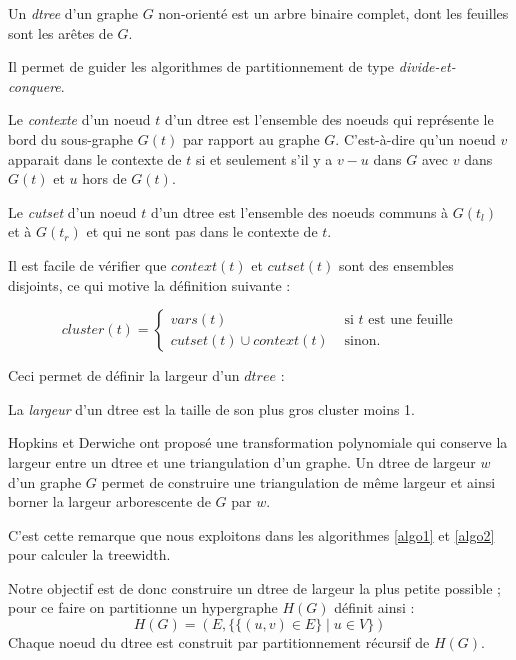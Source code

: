 \documentclass{article}
\begin{document}
\begin{mdef}
Un \emph{dtree} d'un graphe $G$ non-orienté est un arbre binaire
complet, dont les feuilles sont les arêtes de $G$.
\end{mdef}
Il permet de guider les algorithmes de partitionnement de type
\emph{divide-et-conquere}.

\begin{mdef}
Le \emph{contexte} d'un noeud $t$ d'un dtree est l'ensemble des noeuds
qui représente le bord du sous-graphe $G(t)$ par rapport au graphe
$G$. C'est-à-dire qu'un noeud $v$ apparait dans le contexte de $t$ si
et seulement s'il y a $v-u$ dans $G$ avec $v$ dans $G(t)$ et $u$ hors
de $G(t)$.
\end{mdef}

\begin{mdef}
Le \emph{cutset} d'un noeud $t$ d'un dtree est l'ensemble des noeuds
communs à $G(t_l)$ et à $G(t_r)$ et qui ne sont pas dans le contexte
de $t$.
\end{mdef}

Il est facile de vérifier que $context(t)$ et $cutset(t)$ sont des
ensembles disjoints, ce qui motive la définition suivante : 

\begin{mdef}
$$
cluster(t) = \left\{
    \begin{array}{ll}
        vars(t) & \mbox{ si $t$ est une feuille} \\
        cutset(t) \cup context(t) & \mbox{ sinon.}
    \end{array}
\right.
$$
\end{mdef}

Ceci permet de définir la largeur d'un $dtree$ : 
\begin{mdef}
La \emph{largeur} d'un dtree est la taille de son plus gros cluster
moins 1.
\end{mdef}

Hopkins et Derwiche \cite{hop} ont proposé une transformation
polynomiale qui conserve la largeur entre un dtree et une
triangulation d'un graphe.
Un dtree de largeur $w$ d'un graphe $G$ permet
de construire une triangulation de même largeur
et ainsi borner la largeur arborescente de $G$ par $w$.

C'est cette remarque que nous exploitons dans les algorithmes
\ref{algo1} et \ref{algo2} pour calculer la treewidth.

Notre objectif est de donc construire un dtree de largeur la plus
petite possible ; pour ce faire on partitionne un hypergraphe $H(G)$
définit ainsi :
$$ H(G) = (E,\{ \{ (u,v) \in E \} \mid u \in V \}) $$
Chaque noeud du dtree est construit par partitionnement récursif de $H(G)$.
\end{document}

